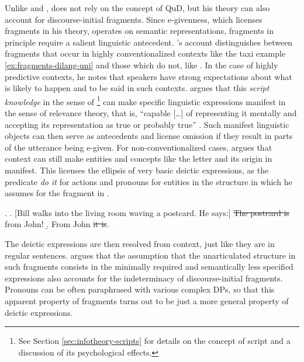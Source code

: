 Unlike \citet{reich2007} and \citet{weir2014}, \citet{merchant2004} does not rely on the concept of QuD, but his theory can also account for discourse-initial fragments. Since e-givenness, which licenses fragments in his theory, operates on semantic representations, fragments in principle require a salient linguistic antecedent. \citeauthor{merchant2004}'s account distinguishes between fragments that occur in highly conventionalized contexts like the taxi example \ref{ex:fragments-dilang-uni} and those which do not, like \Next[a]. In the case of highly predictive contexts, he notes that speakers have strong expectations about what is likely to happen and to be said in such contexts. \citet[730--731]{merchant2004} argues that this \textit{script knowledge} in the sense of \citet{schank.abelson1977}%
%
\footnote{See Section \ref{sec:infotheory-scripts} for details on the concept of script and a discussion of its psychological effects.}\afterfn%
% 
can make specific linguistic expressions manifest in the sense of relevance theory, that is, ``capable [\dots] of representing it mentally and accepting its representation as true or probably true'' \citep[39]{sperber.wilson1986}. Such manifest linguistic objects can then serve as antecedents and license omission if they result in parts of the utterance being e-given. For non-conventionalized cases, \citet[722--727]{merchant2004} argues that context can still make entities and concepts like the letter and its origin in \Next[a] manifest. This licenses the ellipsis of very basic deictic expressions, as the predicate \textit{do it} for actions and pronouns for entities in the structure in \Next[b] which he assumes for the fragment in \Last. 

\ex. \a. [Bill walks into the living room waving a postcard. He says:]
	   \sout{The postcard is} from John!
\b. From John \sout{it is}.

The deictic expressions are then resolved from context, just like they are in regular sentences. \citet[722]{merchant2004} argues that the assumption that the unarticulated structure in such fragments consists in the minimally required and semantically less specified expressions also accounts for the indeterminacy of discourse-initial fragments. Pronouns can be often paraphrased with various complex DPs, so that this apparent property of fragments turns out to be just a more general property of deictic expressions. 

